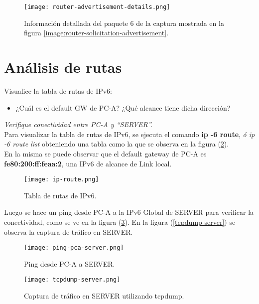 \documentclass[osajnl,twocolumn,showpacs,superscriptaddress,10pt]{revtex4-1} %
\begin{document}
\begin{figure}[H]
    \centering
    \texttt{[image: router-advertisement-details.png]}
    \caption{Información detallada del paquete 6 de la captura mostrada en la figura \ref{image:router-solicitation-advertisement}.}
    \label{image:router-advertisement-details}
\end{figure}

\section{Análisis de rutas}

Visualice la tabla de rutas de IPv6:

\begin{itemize}
    \item ¿Cuál es el default GW de PC-A? ¿Qué alcance tiene dicha dirección?
\end{itemize}

\textit{Verifique conectividad entre PC-A y “SERVER”.} \\

Para visualizar la tabla de rutas de IPv6, se ejecuta el comando \textbf{ip -6 route}, \textit{ó ip -6 route list} obteniendo
una tabla como la que se observa en la figura (\ref{image:ip-route}). \\

En la misma se puede observar que el default gateway de PC-A es \textbf{fe80:200:ff:feaa:2}, una IPv6 de alcance de Link local.

\begin{figure}[H]
    \centering
    \texttt{[image: ip-route.png]}
    \caption{Tabla de rutas de IPv6.}
    \label{image:ip-route}
\end{figure}

Luego se hace un ping desde PC-A a la IPv6 Global de SERVER para verificar la conectividad, como
se ve en la figura (\ref{image:ping-pca-server}). En la figura (\ref{tcpdump-server}) se observa la captura de tráfico
en SERVER.

\begin{figure}[H]
    \centering
    \texttt{[image: ping-pca-server.png]}
    \caption{Ping desde PC-A a SERVER.}
    \label{image:ping-pca-server}
\end{figure}

\begin{figure}[H]
    \centering
    \texttt{[image: tcpdump-server.png]}
    \caption{Captura de tráfico en SERVER utilizando tcpdump.}
    \label{image:tcpdump-server}
\end{figure}
\end{document}
